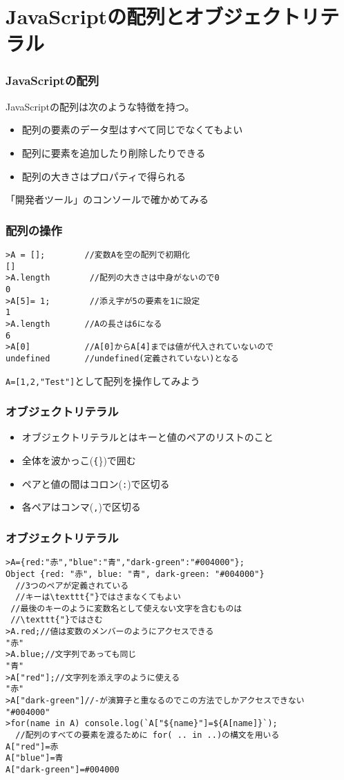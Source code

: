 

\frame{\maketitle}
 \section{JavaScriptの配列とオブジェクトリテラル}
\begin{frame}[containsverbatim]
  \frametitle{JavaScriptの配列}
  JavaScriptの配列は次のような特徴を持つ。
  \begin{itemize}
   \item 配列の要素のデータ型はすべて同じでなくてもよい
   \item 配列に要素を追加したり削除したりできる
   \item 配列の大きさはプロパティで得られる
  \end{itemize}
「開発者ツール」のコンソールで確かめてみる
 \end{frame}
 \begin{frame}[containsverbatim]
  \frametitle{配列の操作}
\begin{Verbatim}
>A = [];        //変数Aを空の配列で初期化
[]
>A.length        //配列の大きさは中身がないので0
0
>A[5]= 1;        //添え字が5の要素を1に設定
1
>A.length       //Aの長さは6になる
6
>A[0]           //A[0]からA[4]までは値が代入されていないので
undefined       //undefined(定義されていない)となる
\end{Verbatim}
  \Verb+A=[1,2,"Test"]+として配列を操作してみよう
 \end{frame}
 \begin{frame}[containsverbatim]
  \frametitle{オブジェクトリテラル}
  \begin{itemize}
   \item   オブジェクトリテラルとはキーと値のペアのリストのこと
   \item 全体を波かっこ(\texttt\{\})で囲む
   \item ペアと値の間はコロン(\texttt{:})で区切る
   \item 各ペアはコンマ(\texttt{,})で区切る
  \end{itemize}
 \end{frame}
 \begin{frame}[containsverbatim]
  \frametitle{オブジェクトリテラル}
  \small
\begin{Verbatim}
>A={red:"赤","blue":"青","dark-green":"#004000"};
Object {red: "赤", blue: "青", dark-green: "#004000"}
  //3つのペアが定義されている
  //キーは\texttt{"}ではさまなくてもよい
 //最後のキーのように変数名として使えない文字を含むものは
 //\texttt{"}ではさむ
>A.red;//値は変数のメンバーのようにアクセスできる
"赤"
>A.blue;//文字列であっても同じ
"青"
>A["red"];//文字列を添え字のように使える
"赤"
>A["dark-green"]//-が演算子と重なるのでこの方法でしかアクセスできない
"#004000"
>for(name in A) console.log(`A["${name}"]=${A[name]}`);
  //配列のすべての要素を渡るために for( .. in ..)の構文を用いる
A["red"]=赤
A["blue"]=青
A["dark-green"]=#004000
\end{Verbatim}
 \end{frame}
